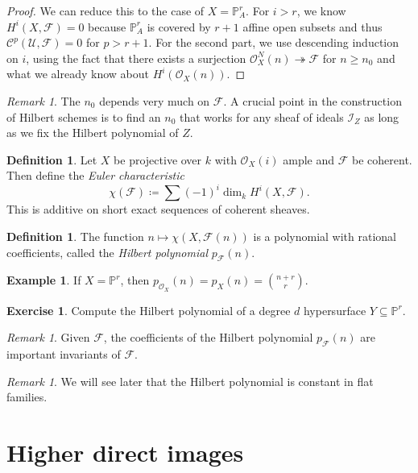 \documentclass[leqno, openany]{memoir}
\theoremstyle{definition}
\newtheorem{defn}[thm]{Definition}
\newtheorem{exm}[thm]{Example}
\newtheorem{exer}[thm]{Exercise}
\theoremstyle{remark}
\newtheorem{rmk}[thm]{Remark}
\theoremstyle{plain}
\theoremstyle{definition}
\theoremstyle{remark}
\renewcommand{\P}{\mathbb{P}}
\newcommand{\mc}[1]{\mathcal{#1}}
\begin{document}
\begin{proof}
    We can reduce this to the case of $X = \P^r_A$. For $i > r$, we know $H^i(X, \mc{F}) = 0$ because $\P^r_A$ is covered by $r+1$ affine open subsets and thus $\mc{C}^p(\mc{U}, \mc{F}) = 0$ for $p > r+1$. For the second part, we use descending induction on $i$, using the fact that there exists a surjection $\mc{O}_X^N(n) \twoheadrightarrow \mc{F}$ for $n \geq n_0$ and what we already know about $H^i(\mc{O}_X(n))$.
\end{proof}

\begin{rmk}
    The $n_0$ depends very much on $\mc{F}$. A crucial point in the construction of Hilbert schemes is to find an $n_0$ that works for any sheaf of ideals $\mc{I}_Z$ as long as we fix the Hilbert polynomial of $Z$.
\end{rmk}

\begin{defn}
    Let $X$ be projective over $k$ with $\mc{O}_X(i)$ ample and $\mc{F}$ be coherent. Then define the \textit{Euler characteristic} 
    \[ \chi(\mc{F}) \coloneqq \sum {(-1)}^i \dim_k H^i(X, \mc{F}). \]
    This is additive on short exact sequences of coherent sheaves.
\end{defn}

\begin{defn}
    The function $n \mapsto \chi(X, \mc{F}(n))$ is a polynomial with rational coefficients, called the \textit{Hilbert polynomial} $p_{\mc{F}}(n)$.
\end{defn}

\begin{exm}
    If $X = \P^r$, then $p_{\mc{O}_X}(n) = p_X(n) = \binom{n+r}{r}$.
\end{exm}

\begin{exer}
    Compute the Hilbert polynomial of a degree $d$ hypersurface $Y \subseteq \P^r$.
\end{exer}

\begin{rmk}
    Given $\mc{F}$, the coefficients of the Hilbert polynomial $p_{\mc{F}}(n)$ are important invariants of $\mc{F}$.
\end{rmk}

\begin{rmk}
    We will see later that the Hilbert polynomial is constant in flat families.
\end{rmk}

\section{Higher direct images}%
\label{sec:higher_direct_images}
\end{document}
